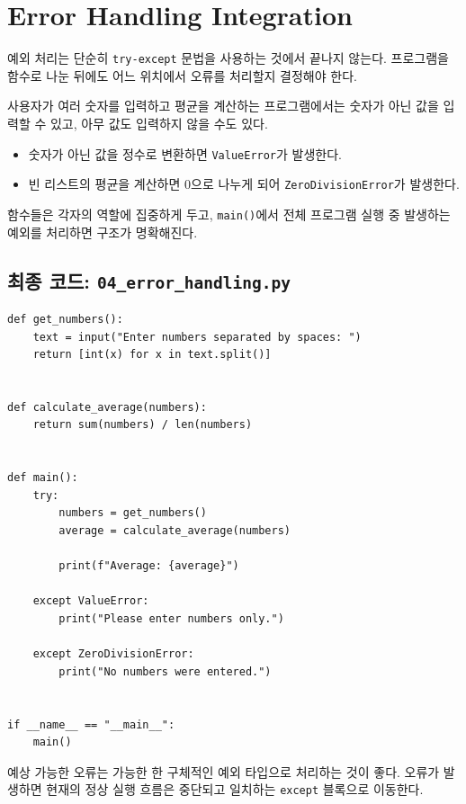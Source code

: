 \documentclass[11pt,a4paper]{article}
\begin{document}
\section{Error Handling Integration}

예외 처리는 단순히 \texttt{try-except} 문법을 사용하는 것에서 끝나지 않는다. 프로그램을 함수로 나눈 뒤에도 어느 위치에서 오류를 처리할지 결정해야 한다.

사용자가 여러 숫자를 입력하고 평균을 계산하는 프로그램에서는 숫자가 아닌 값을 입력할 수 있고, 아무 값도 입력하지 않을 수도 있다.

\begin{itemize}[leftmargin=1.5em]
    \item 숫자가 아닌 값을 정수로 변환하면 \texttt{ValueError}가 발생한다.
    \item 빈 리스트의 평균을 계산하면 0으로 나누게 되어 \texttt{ZeroDivisionError}가 발생한다.
\end{itemize}

함수들은 각자의 역할에 집중하게 두고, \texttt{main()}에서 전체 프로그램 실행 중 발생하는 예외를 처리하면 구조가 명확해진다.

\subsection{최종 코드: \texttt{04\_error\_handling.py}}

\begin{lstlisting}
def get_numbers():
    text = input("Enter numbers separated by spaces: ")
    return [int(x) for x in text.split()]


def calculate_average(numbers):
    return sum(numbers) / len(numbers)


def main():
    try:
        numbers = get_numbers()
        average = calculate_average(numbers)

        print(f"Average: {average}")

    except ValueError:
        print("Please enter numbers only.")

    except ZeroDivisionError:
        print("No numbers were entered.")


if __name__ == "__main__":
    main()
\end{lstlisting}

\begin{importantbox}
예상 가능한 오류는 가능한 한 구체적인 예외 타입으로 처리하는 것이 좋다. 오류가 발생하면 현재의 정상 실행 흐름은 중단되고 일치하는 \texttt{except} 블록으로 이동한다.
\end{importantbox}
\end{document}
